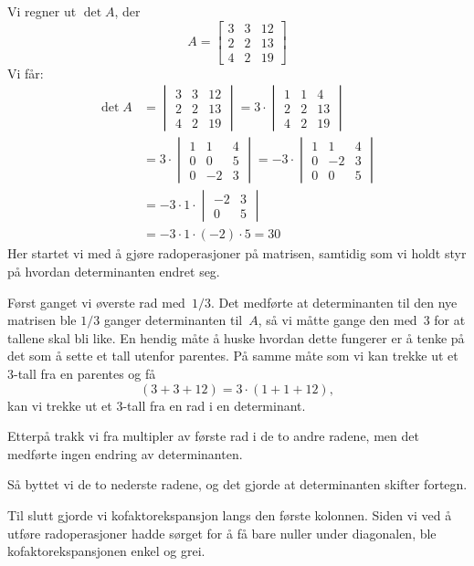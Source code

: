 \begin{ex}
\label{ex:det-radop}
Vi regner ut $\det A$, der
\[
A =
\begin{bmatrix}
3 & 3 & 12 \\
2 & 2 & 13 \\
4 & 2 & 19
\end{bmatrix}
\]
Vi får:
\begin{align*}
\det A &=
\begin{vmatrix}
3 & 3 & 12 \\
2 & 2 & 13 \\
4 & 2 & 19
\end{vmatrix}
=
3 \cdot
\begin{vmatrix}
1 & 1 &  4 \\
2 & 2 & 13 \\
4 & 2 & 19
\end{vmatrix}
\\
&=
3 \cdot
\begin{vmatrix}
1 &  1 &  4 \\
0 &  0 &  5 \\
0 & -2 &  3
\end{vmatrix}
=
- 3 \cdot
\begin{vmatrix}
1 &  1 &  4 \\
0 & -2 &  3 \\
0 &  0 &  5
\end{vmatrix}
\\
&= -3 \cdot 1 \cdot \begin{vmatrix} -2 & 3 \\ 0 & 5 \end{vmatrix}
\\
&= -3 \cdot 1 \cdot (-2) \cdot 5
= 30
\end{align*}
Her startet vi med å gjøre radoperasjoner på matrisen, samtidig som vi
holdt styr på hvordan determinanten endret seg.

Først ganget vi øverste rad med~$1/3$.  Det medførte at determinanten
til den nye matrisen ble $1/3$ ganger determinanten til~$A$, så vi
måtte gange den med~$3$ for at tallene skal bli like.  En hendig måte
å huske hvordan dette fungerer er å tenke på det som å sette et tall
utenfor parentes.  På samme måte som vi kan trekke ut et $3$-tall fra
en parentes og få
\[
(3 + 3 + 12) = 3 \cdot (1 + 1 + 12),
\]
kan vi trekke ut et $3$-tall fra en rad i en determinant.

Etterpå trakk vi fra multipler av første rad i de to andre radene, men
det medførte ingen endring av determinanten.

Så byttet vi de to nederste radene, og det gjorde at determinanten
skifter fortegn.

Til slutt gjorde vi kofaktorekspansjon langs den første kolonnen.
Siden vi ved å utføre radoperasjoner hadde sørget for å få bare nuller
under diagonalen, ble kofaktorekspansjonen enkel og grei.
\end{ex}


